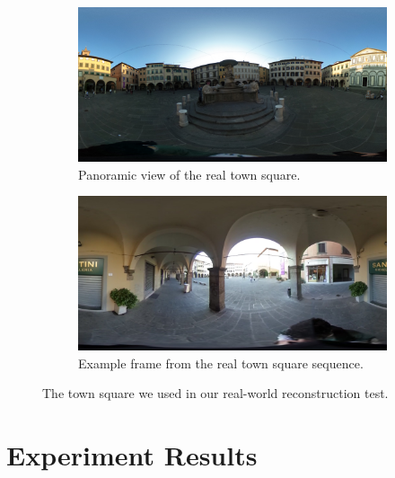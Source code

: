\begin{figure}[h]
\centering
	\begin{subfigure}{0.7\linewidth}
		\centering
		\includegraphics[width=\linewidth]{img/piazzaLeoni.jpg}
		\caption{Panoramic view of the real town square.}
	\end{subfigure}
	\begin{subfigure}{0.7\linewidth}
		\centering
		\includegraphics[width=\linewidth]{img/piazzaLeoni_exampleds.jpg}
		\caption{Example frame from the real town square sequence.}
	\end{subfigure}
\caption{The town square we used in our real-world reconstruction test.}
\label{fig:piazzaLeoni}
\end{figure}

\section{Experiment Results}
